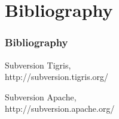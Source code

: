 \documentclass[xcolor=dvipsnames]{beamer}
\begin{document}
\section{Bibliography}
\begin{frame}[allowframebreaks]
\frametitle{Bibliography}
\begin{thebibliography}{9}

  Subversion Tigris,\\
  http://subversion.tigris.org/

  Subversion Apache,\\
  http://subversion.apache.org/

\end{thebibliography}
\end{frame}
\end{document}
